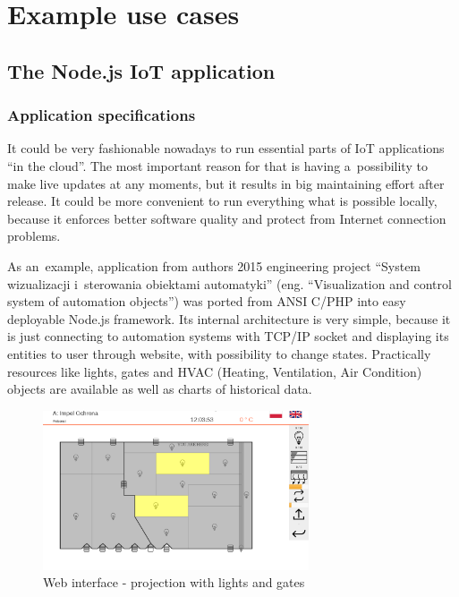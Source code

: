 \documentclass[printmode]{mgr}
\begin{document}






\chapter{Example use cases}


\section{The Node.js IoT application}

\subsection*{Application specifications}

It could be very fashionable nowadays to run essential parts of IoT applications ``in the cloud''.
The most important reason for that is having a~possibility to make live updates at any moments, but it results in big maintaining effort after release.
It could be more convenient to run everything what is possible locally, because it enforces better software quality and protect from Internet connection problems.

As an~example, application from authors 2015 engineering project ``System wizualizacji i~sterowania obiektami automatyki''\cite{book:cdynak-scada} (eng. ``Visualization and control system of automation objects'') was ported from ANSI C/PHP into easy deployable Node.js framework.
Its internal architecture is very simple, because it is just connecting to automation systems with TCP/IP socket and displaying its entities to user through website, with possibility to change states.
Practically resources like lights, gates and HVAC (Heating, Ventilation, Air Condition) objects are available as well as charts of historical data.


\begin{figure}[htbp]
  \centering
    \includegraphics[width=0.7\textwidth]{4-web.png}
    \caption{Web interface - projection with lights and gates}
  \label{fig:4-web}
\end{figure}
\end{document}
